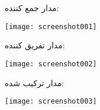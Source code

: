 مدار جمع کننده:
	
\qquad \qquad \qquad \texttt{[image: screenshot001]}

مدار تفریق کننده:

\qquad \qquad \qquad
	\texttt{[image: screenshot002]}


مدار ترکیب شده:

\qquad \qquad \qquad
	\texttt{[image: screenshot003]}